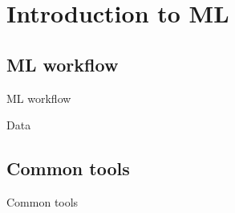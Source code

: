 \section{Introduction to ML}

\subsection{ML workflow}

\begin{frame}{ML workflow}
    
\end{frame}

\begin{frame}{Data}
    
\end{frame}

\subsection{Common tools}

\begin{frame}{Common tools}


\end{frame}
